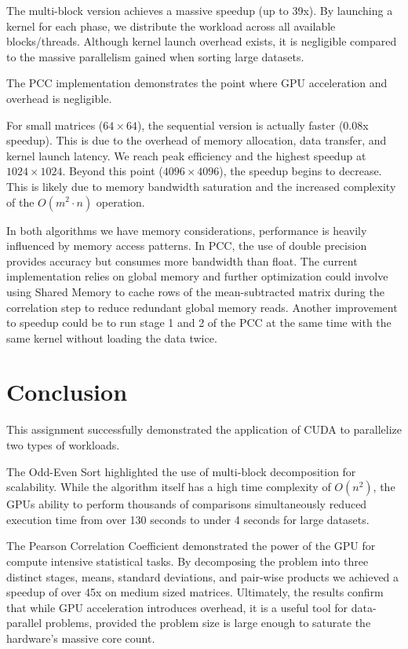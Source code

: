 \documentclass[11pt,a4paper]{article}
\begin{document}
The multi-block version achieves a massive speedup (up to 39x). By launching a kernel for each phase, we distribute the workload across all available blocks/threads. Although kernel launch overhead exists, it is negligible compared to the massive parallelism gained when sorting large datasets.

The PCC implementation demonstrates the point where GPU acceleration and overhead is negligible.

For small matrices ($64 \times 64$), the sequential version is actually faster (0.08x speedup). This is due to the overhead of memory allocation, data transfer, and kernel launch latency. We reach peak efficiency and the highest speedup at $1024 \times 1024$. Beyond this point ($4096 \times 4096$), the speedup begins to decrease. This is likely due to memory bandwidth saturation and the increased complexity of the $O(m^2 \cdot n)$ operation.

In both algorithms we have memory considerations, performance is heavily influenced by memory access patterns. In PCC, the use of double precision provides accuracy but consumes more bandwidth than float. The current implementation relies on global memory and further optimization could involve using Shared Memory to cache rows of the mean-subtracted matrix during the correlation step to reduce redundant global memory reads.
Another improvement to speedup could be to run stage 1 and 2 of the PCC at the same time with the same kernel without loading the data twice.

\section{Conclusion}
This assignment successfully demonstrated the application of CUDA to parallelize two types of workloads.

The Odd-Even Sort highlighted the use of multi-block decomposition for scalability. While the algorithm itself has a high time complexity of $O(n^2)$, the GPUs ability to perform thousands of comparisons simultaneously reduced execution time from over 130 seconds to under 4 seconds for large datasets.

The Pearson Correlation Coefficient demonstrated the power of the GPU for compute intensive statistical tasks. By decomposing the problem into three distinct stages, means, standard deviations, and pair-wise products we achieved a speedup of over 45x on medium sized matrices. Ultimately, the results confirm that while GPU acceleration introduces overhead, it is a useful tool for data-parallel problems, provided the problem size is large enough to saturate the hardware's massive core count.
\end{document}
